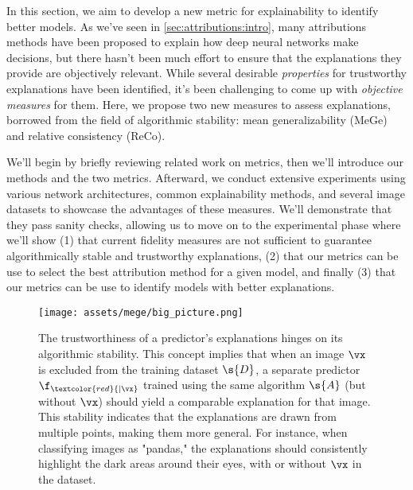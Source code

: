 \newcommand{\fidelity}{\textit{Fidelity}}
\newcommand{\stability}{\textit{Stability}}
\newcommand{\comprehensibility}{\textit{Comprehensibility}}
\newcommand{\consistency}{\textit{Consistency}}
\newcommand{\representativity}{\textit{Generalizability}}
\newcommand{\mege}{MeGe}
\newcommand{\reco}{ReCo}
\newcommand{\Setp}{\boldsymbol{\mathcal{S}^{ \ne }}}
\newcommand{\Setm}{\boldsymbol{\mathcal{S}^{ = }}}
\newcommand{\Seta}{\boldsymbol{\mathcal{S}}}
\newcommand{\fold}{\mathcal{V}}
\newcommand{\deltaij}{\delta_{\vx}^{(i,j)}}

In this section, we aim to develop a new metric for explainability to identify better models. As we've seen in \autoref{sec:attributions:intro}, many attributions methods have been proposed to explain how deep neural networks make decisions, but there hasn't been much effort to ensure that the explanations they provide are objectively relevant. While several desirable \textit{properties} for trustworthy explanations have been identified, it's been challenging to come up with \textit{objective measures} for them. Here, we propose two new measures to assess explanations, borrowed from the field of algorithmic stability: mean generalizability (\mege) and relative consistency (\reco).

We'll begin by briefly reviewing related work on metrics, then we'll introduce our methods and the two metrics. Afterward, we conduct extensive experiments using various network architectures, common explainability methods, and several image datasets to showcase the advantages of these measures. We'll demonstrate that they pass sanity checks, allowing us to move on to the experimental phase where we'll show (1) that current fidelity measures are not sufficient to guarantee algorithmically stable and trustworthy explanations, (2) that our metrics can be use to select the best attribution method for a given model, and finally (3) that our metrics can be use to identify models with better explanations.

\begin{figure}[ht]
  \centering
  \texttt{[image: assets/mege/big\_picture.png]}
  \caption{ 
  The trustworthiness of a predictor's explanations hinges on its algorithmic stability. This concept implies that when an image $\vx$ is excluded from the training dataset $\s{D}$, a separate predictor $\f_{\textcolor{red}{|\vx}}$ trained using the same algorithm $\s{A}$ (but without $\vx$) should yield a comparable explanation for that image. This stability indicates that the explanations are drawn from multiple points, making them more general. For instance, when classifying images as "pandas," the explanations should consistently highlight the dark areas around their eyes, with or without $\vx$ in the dataset.
  }
  \label{fig:big_picture}
\end{figure}

